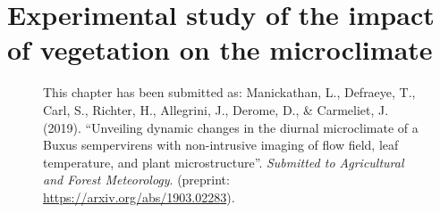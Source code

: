 \chapter{Experimental study of the impact of vegetation on the microclimate}
\label{ch:microclimatestudy}
\def\figdir{chapters/ch04_microclimatestudy/figures}


\begin{figure}[h]
	\centering
	\begin{minipage}{0.9\textwidth}
		\textsf{ \footnotesize This chapter has been submitted as: Manickathan, L., Defraeye, T., Carl, S., Richter, H., Allegrini, J., Derome, D., \& Carmeliet, J. (2019). ``Unveiling dynamic changes in the diurnal microclimate of a Buxus sempervirens with non-intrusive imaging of flow field, leaf temperature, and plant microstructure''. \textit{Submitted to Agricultural and Forest Meteorology}. (preprint: \url{https://arxiv.org/abs/1903.02283}). }
	\end{minipage}
\end{figure}
\vspace{2em}


